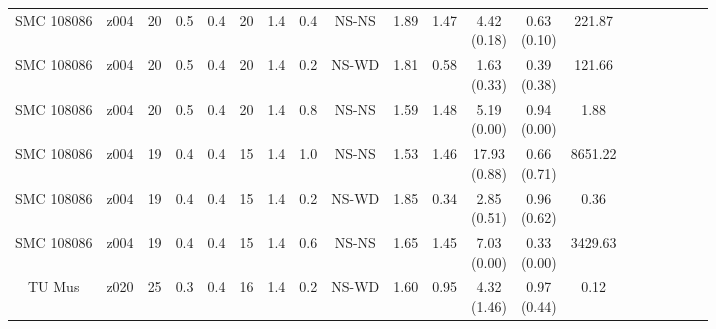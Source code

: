 \begin{table}
\begin{tabular}{cc|ccc|ccc|ccc|ccc|ccc|ccc}
        SMC 108086 & z004 & 20 & 0.5 & 0.4 & 20 & 1.4 & 0.4 & NS-NS & 1.89 & 1.47 & \mlc{4.42\\(0.18)} & \mlc{0.63\\(0.10)} & 221.87 & \citet{Hobbs:2005} \\
        SMC 108086 & z004 & 20 & 0.5 & 0.4 & 20 & 1.4 & 0.2 & NS-WD & 1.81 & 0.58 & \mlc{1.63\\(0.33)} & \mlc{0.39\\(0.38)} & 121.66 & \citet{Verbunt:2017} \\
        SMC 108086 & z004 & 20 & 0.5 & 0.4 & 20 & 1.4 & 0.8 & NS-NS & 1.59 & 1.48 & \mlc{5.19\\(0.00)} & \mlc{0.94\\(0.00)} & 1.88 & \citet{Richards:2023} \\
        SMC 108086 & z004 & 19 & 0.4 & 0.4 & 15 & 1.4 & 1.0 & NS-NS & 1.53 & 1.46 & \mlc{17.93\\(0.88)} & \mlc{0.66\\(0.71)} & 8651.22 & \citet{Hobbs:2005} \\
        SMC 108086 & z004 & 19 & 0.4 & 0.4 & 15 & 1.4 & 0.2 & NS-WD & 1.85 & 0.34 & \mlc{2.85\\(0.51)} & \mlc{0.96\\(0.62)} & 0.36 & \citet{Verbunt:2017} \\
        SMC 108086 & z004 & 19 & 0.4 & 0.4 & 15 & 1.4 & 0.6 & NS-NS & 1.65 & 1.45 & \mlc{7.03\\(0.00)} & \mlc{0.33\\(0.00)} & 3429.63 & \citet{Richards:2023} \\
        TU Mus & z020 & 25 & 0.3 & 0.4 & 16 & 1.4 & 0.2 & NS-WD & 1.60 & 0.95 & \mlc{4.32\\(1.46)} & \mlc{0.97\\(0.44)} & 0.12 & \citet{Hobbs:2005} \\
        \bottomrule
    \end{tabular}
\end{table}
